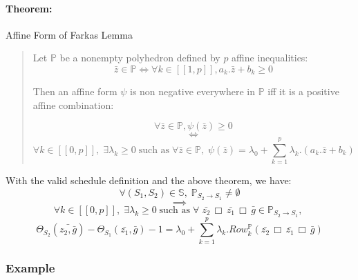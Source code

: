 	\paragraph{Theorem:} Affine Form of Farkas Lemma

\begin{quote}	
	Let $\mathbb{P}$ be a nonempty polyhedron defined by $p$ affine inequalities:
	$$ \bar{z} \in \mathbb{P} \iff \forall k \in [\![ 1, p ]\!], a_{k}.\bar{z} + b_{k} \geq 0 $$
	
	Then an affine form $\psi$ is non negative everywhere in $\mathbb{P}$ iff it is a positive affine combination:
	
	$$ \forall \bar{z} \in \mathbb{P}, \psi(\bar{z}) \geq 0 $$
	$$ \iff $$
	$$ \forall k \in [\![ 0, p ]\!], \; \exists \lambda_{k} \geq 0 \;\text{such as}\;
	\forall \bar{z} \in \mathbb{P}, \; \psi(\bar{z}) = \lambda_{0} + \sum_{k = 1}^{p} \lambda_{k}.(a_{k}.\bar{z} + b_{k}) $$
\end{quote}

	With the valid schedule definition and the above theorem, we have: 
	$$ \forall (S_{1}, S_{2}) \in \mathbb{S}, \; \mathbb{P}_{S_{2} \rightarrow S_{1}} \neq \emptyset $$
	$$ \implies $$
	$$ \forall k \in [\![ 0, p ]\!], \; \exists \lambda_{k} \geq 0 \;\text{such as}\;
	\forall \; \bar{z_{2}} \,\Box\, \bar{z_{1}} \,\Box\, \bar{g} \in \mathbb{P}_{S_{2} \rightarrow S_{1}}, \; $$
	$$ \Theta_{S_{2}}(\bar{z_{2}, \bar{g}}) - \Theta_{S_{1}}(\bar{z_{1}}, \bar{g}) - 1 =
	\lambda_{0} + \sum_{k = 1}^{p} \lambda_{k} . Row_{k}^{\mathbb{P}}(\bar{z_{2}} \,\Box\, \bar{z_{1}} \,\Box\, \bar{g}) $$

			\subsubsection{Example}
			\label{polyhedric:schedule:vss:example}

